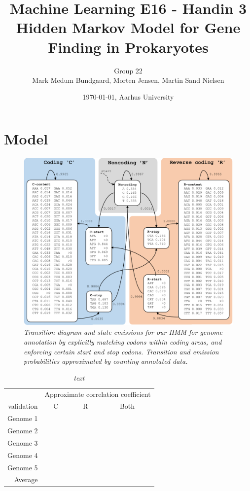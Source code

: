 \documentclass[a4paper,10pt,article,oneside,english]{memoir}
\let\oldcaption\caption
\renewcommand{\caption}[1]{\oldcaption{\emph{#1}}}
\begin{document}
	\title{Machine Learning E16 - Handin 3\\
		 Hidden Markov Model for Gene Finding in Prokaryotes}
	\author{Group 22\\
		Mark Medum Bundgaard, Morten Jensen, Martin Sand Nielsen}
	\date{\today, Aarhus University}
	
	\mainmatter
	\maketitle

\section{Model}

\begin{figure}
	\centering
	\includegraphics[width=\linewidth]{HMM_graph_cropped.pdf}
	\caption{Transition diagram and state emissions for our HMM for genome annotation by explicitly matching codons within coding areas, and enforcing certain start and stop codons. Transition and emission probabilities approximated by counting annotated data.}
	\label{fig:hmm_graph}
\end{figure}
	
\begin{table}
	\centering
	\caption{text}
	\label{tab:ac}
	\begin{tabular}{rccc}
		& \multicolumn{3}{c}{Approximate correlation coefficient} \\ 
		validation & C & R & Both \\ 
		\midrule
		Genome 1 &  &  &  \\ 
		Genome 2 &  &  &  \\ 
		Genome 3 &  &  &  \\ 
		Genome 4 &  &  &  \\ 
		Genome 5 &  &  &  \\ 
		Average & & & \\
	\end{tabular} 
\end{table}
	
\end{document}
